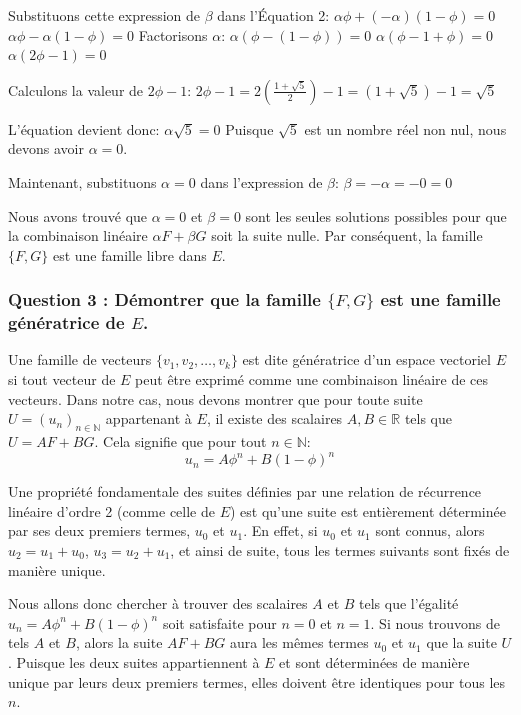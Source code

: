 \documentclass{report}
\begin{document}
Substituons cette expression de $\beta$ dans l'Équation 2:
$\alpha \phi + (-\alpha) (1-\phi) = 0$
$\alpha \phi - \alpha (1-\phi) = 0$
Factorisons $\alpha$:
$\alpha (\phi - (1-\phi)) = 0$
$\alpha (\phi - 1 + \phi) = 0$
$\alpha (2\phi - 1) = 0$

Calculons la valeur de $2\phi - 1$:
$2\phi - 1 = 2 \left(\frac{1+\sqrt{5}}{2}\right) - 1 = (1+\sqrt{5}) - 1 = \sqrt{5}$

L'équation devient donc:
$\alpha \sqrt{5} = 0$
Puisque $\sqrt{5}$ est un nombre réel non nul, nous devons avoir $\alpha = 0$.

Maintenant, substituons $\alpha = 0$ dans l'expression de $\beta$:
$\beta = -\alpha = -0 = 0$

Nous avons trouvé que $\alpha = 0$ et $\beta = 0$ sont les seules solutions possibles pour que la combinaison linéaire $\alpha F + \beta G$ soit la suite nulle.
Par conséquent, la famille $\{F, G\}$ est une famille libre dans $E$.

\subsubsection*{Question 3 : Démontrer que la famille $\{F, G\}$ est une famille génératrice de $E$.}

Une famille de vecteurs $\{v_1, v_2, \dots, v_k\}$ est dite génératrice d'un espace vectoriel $E$ si tout vecteur de $E$ peut être exprimé comme une combinaison linéaire de ces vecteurs.
Dans notre cas, nous devons montrer que pour toute suite $U = (u_n)_{n \in \mathbb{N}}$ appartenant à $E$, il existe des scalaires $A, B \in \mathbb{R}$ tels que $U = A F + B G$.
Cela signifie que pour tout $n \in \mathbb{N}$:
$$u_n = A \phi^n + B (1-\phi)^n$$

Une propriété fondamentale des suites définies par une relation de récurrence linéaire d'ordre 2 (comme celle de $E$) est qu'une suite est entièrement déterminée par ses deux premiers termes, $u_0$ et $u_1$. En effet, si $u_0$ et $u_1$ sont connus, alors $u_2 = u_1 + u_0$, $u_3 = u_2 + u_1$, et ainsi de suite, tous les termes suivants sont fixés de manière unique.

Nous allons donc chercher à trouver des scalaires $A$ et $B$ tels que l'égalité $u_n = A \phi^n + B (1-\phi)^n$ soit satisfaite pour $n=0$ et $n=1$. Si nous trouvons de tels $A$ et $B$, alors la suite $A F + B G$ aura les mêmes termes $u_0$ et $u_1$ que la suite $U$. Puisque les deux suites appartiennent à $E$ et sont déterminées de manière unique par leurs deux premiers termes, elles doivent être identiques pour tous les $n$.
\end{document}

